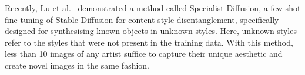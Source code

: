 \documentclass[conference,table]{IEEEtran} %
\begin{document}


Recently, Lu et al.~\cite{lu_specialist_2023} demonstrated a method called Specialist Diffusion, a few-shot fine-tuning of Stable Diffusion for content-style disentanglement, specifically designed for synthesising known objects in unknown styles. Here, unknown styles refer to the styles that were not present in the training data. With this method, less than 10 images of any artist suffice to capture their unique aesthetic and create novel images in the same fashion.



\end{document}
